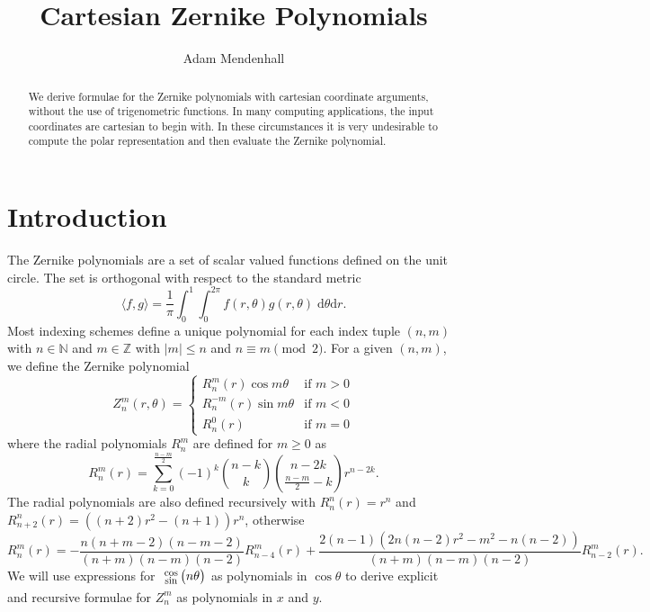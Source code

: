 \documentclass[showpacs,%
  nofootinbib,aps,superscriptaddress,%
  eqsecnum,prd,notitlepage,showkeys,10pt]{article}
\newcommand{\sincos}{\resizebox!{1em}{\(\begin{array}c\cos\vspace{-1ex}\\\sin\end{array}\)}\hspace{-.5ex}}
\begin{document}
\title{Cartesian Zernike Polynomials}
\author{Adam Mendenhall}

\begin{abstract}
We derive formulae for the Zernike polynomials with cartesian coordinate arguments, without the use of trigenometric functions.  In many computing applications, the input coordinates are cartesian to begin with.  In these circumstances it is very undesirable to compute the polar representation and then evaluate the Zernike polynomial.
\end{abstract}

\maketitle

\section{Introduction}
\label{sec:intro}

The Zernike polynomials are a set of scalar valued functions defined on the unit circle.  The set is orthogonal with respect to the standard metric
\[\langle f,g\rangle=\frac1\pi\int_0^1\int_0^{2\pi}f(r,\theta)g(r,\theta)\;\mathrm d\theta\mathrm dr.\]
Most indexing schemes define a unique polynomial for each index tuple $(n,m)$ with $n\in\mathbb N$ and $m\in\mathbb Z$ with $|m|\leq n$ and $n\equiv m\pmod2$.  For a given $(n,m)$, we define the Zernike polynomial
\[Z_n^m(r,\theta)=\left\{\begin{array}{cl}R_n^m(r)\cos m\theta&\text{if }m>0\\R_n^{-m}(r)\sin m\theta&\text{if }m<0\\R_n^0(r)&\text{if }m=0\end{array}\right.\]
where the radial polynomials $R_n^m$ are defined for $m\geq0$ as 
\[R_n^m(r)=\sum_{k=0}^{\frac{n-m}2}(-1)^k\binom{n-k}k\binom{n-2k}{\frac{n-m}2-k}r^{n-2k}.\]
The radial polynomials are also defined recursively with $R_n^n(r)=r^n$ and $R_{n+2}^n(r)=\left((n+2)r^2-(n+1)\right)r^n$, otherwise
\[R_n^m(r)=-\frac{n(n+m-2)(n-m-2)}{(n+m)(n-m)(n-2)}R_{n-4}^m(r)+\frac{2(n-1)(2n(n-2)r^2-m^2-n(n-2))}{(n+m)(n-m)(n-2)}R_{n-2}^m(r).\]
We will use expressions for $\sincos\big(n\theta\big)$ as polynomials in $\cos\theta$ to derive explicit and recursive formulae for $Z_n^m$ as polynomials in $x$ and $y$.
\end{document}
